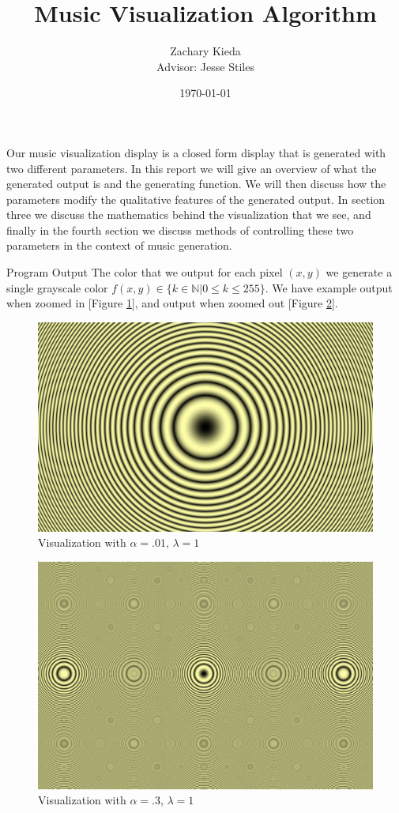 \documentclass[11pt]{article}
\title{Music Visualization Algorithm}
\author{Zachary Kieda\\{Advisor: Jesse Stiles}}
\date{\today}
\newcommand{\reffig}[1]{[Figure \ref{#1}]}
\begin{document}
\maketitle


Our music visualization display is a closed form display that is generated with two different parameters. In this report we will give an overview of what the generated output is and the generating function. We will then discuss how the parameters modify the qualitative features of the generated output. In section three we discuss the mathematics behind the visualization that we see, and finally in the fourth section we discuss methods of controlling these two parameters in the context of music generation. 

\begin{section}{Program Output}
The color that we output for each pixel $(x, y)$ we generate a single grayscale color $f(x, y) \in \{k \in \mathbb{N}|0 \le k \le 255\}$. We have example output when zoomed in \reffig{fig:vizsmall}, and output when zoomed out \reffig{fig:vizlarge}. 

\begin{figure}[h]
\centering
\includegraphics[width=.9\textwidth]{viz-small.png}
\caption{Visualization with $\alpha = .01$, $\lambda = 1$}
\label{fig:vizsmall}
\end{figure}

\begin{figure}[h]
\centering
\includegraphics[width=.9\textwidth]{viz-large.png}
\caption{Visualization with $\alpha = .3$, $\lambda = 1$}
\label{fig:vizlarge}
\end{figure}


\end{section}
\end{document}
